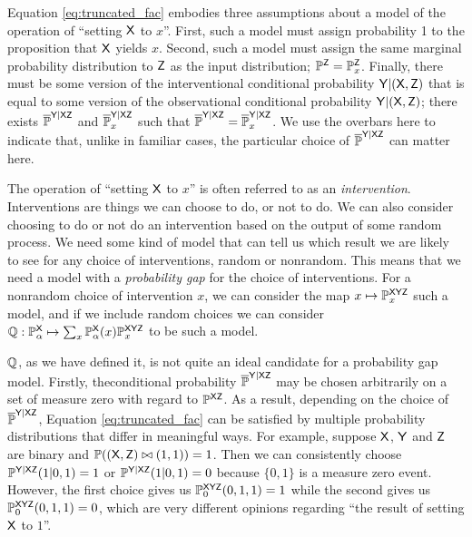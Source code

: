 Equation \ref{eq:truncated_fac} embodies three assumptions about a model of the operation of ``setting $\mathsf{X}$ to $x$''. First, such a model must assign probability 1 to the proposition that $\mathsf{X}$ yields $x$. Second, such a model must assign the same marginal probability distribution to $\mathsf{Z}$ as the input distribution; $\mathbb{P}^{\mathsf{Z}}=\mathbb{P}_{x}^{\mathsf{Z}}$. Finally, there must be some version of the interventional conditional probability $\mathsf{Y}|(\mathsf{X},\mathsf{Z})$ that is equal to some version of the observational conditional probability $\mathsf{Y}|(\mathsf{X},\mathsf{Z})$; there exists $\overline{\mathbb{P}}^{\mathsf{Y}|\mathsf{XZ}}$ and $\overline{\mathbb{P}}_x^{\mathsf{Y}|\mathsf{XZ}}$ such that $\overline{\mathbb{P}}^{\mathsf{Y}|\mathsf{XZ}}=\overline{\mathbb{P}}_x^{\mathsf{Y}|\mathsf{XZ}}$. We use the overbars here to indicate that, unlike in familiar cases, the particular choice of $\overline{\mathbb{P}}^{\mathsf{Y}|\mathsf{XZ}}$ can matter here.


The operation of ``setting $\mathsf{X}$ to $x$'' is often referred to as an \emph{intervention}. Interventions are things we can choose to do, or not to do. We can also consider choosing to do or not do an intervention based on the output of some random process. We need some kind of model that can tell us which result we are likely to see for any choice of interventions, random or nonrandom. This means that we need a model with a \emph{probability gap} for the choice of interventions. For a nonrandom choice of intervention $x$, we can consider the map $x\mapsto \mathbb{P}^{\mathsf{XYZ}}_{x}$ such a model, and if we include random choices we can consider $\mathbb{Q}:\mathbb{P}_\alpha^{\mathsf{X}}\mapsto \sum_{x} \mathbb{P}_\alpha^{\mathsf{X}}(x) \mathbb{P}^{\mathsf{XYZ}}_{x}$ to be such a model.

$\mathbb{Q}$, as we have defined it, is not quite an ideal candidate for a probability gap model. Firstly, theconditional probability $\overline{\mathbb{P}}^{\mathsf{Y}|\mathsf{XZ}}$ may be chosen arbitrarily on a set of measure zero with regard to $\mathbb{P}^{\mathsf{XZ}}$. As a result, depending on the choice of $\overline{\mathbb{P}}^{\mathsf{Y}|\mathsf{XZ}}$, Equation \ref{eq:truncated_fac} can be satisfied by multiple probability distributions that differ in meaningful ways. For example, suppose $\mathsf{X}$, $\mathsf{Y}$ and $\mathsf{Z}$ are binary and $\mathbb{P}((\mathsf{X}, \mathsf{Z})\bowtie (1,1))=1$. Then we can consistently choose $\mathbb{P}^{\mathsf{Y|XZ}}(1|0,1)=1$ or $\mathbb{P}^{\mathsf{Y|XZ}}(1|0,1)=0$ because $\{0,1\}$ is a measure zero event. However, the first choice gives us  $\mathbb{P}^{\mathsf{XYZ}}_{0}(0,1,1)=1$ while the second gives us $\mathbb{P}^{\mathsf{XYZ}}_{0}(0,1,1)=0$, which are very different opinions regarding ``the result of setting $\mathsf{X}$ to $1$''.

